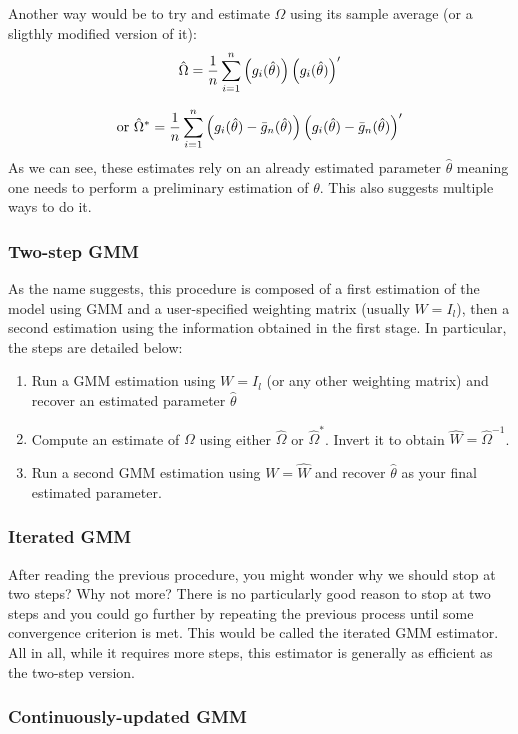 Another way would be to try and estimate $\Omega$ using its sample average (or a sligthly modified version of it): $$\hat\Omega = \frac{1}{n} \sum_{i=1}^{n}\left(g_i(\hat\theta)\right)\left(g_i(\hat\theta)\right)' $$

$$\text{or } \hat\Omega^* = \frac{1}{n} \sum_{i=1}^{n}\left(g_i(\hat\theta) - \bar g_n(\hat\theta)\right)\left(g_i(\hat\theta) - \bar g_n(\hat\theta)\right)' $$ As we can see, these estimates rely on an already estimated parameter $\hat\theta$ meaning one needs to perform a preliminary estimation of $\theta$. This also suggests multiple ways to do it.

\subsubsection{Two-step GMM}

As the name suggests, this procedure is composed of a first estimation of the model using GMM and a user-specified weighting matrix (usually $W = I_l$), then a second estimation using the information obtained in the first stage. In particular, the steps are detailed below: \begin{enumerate}
\item Run a GMM estimation using $W = I_l$ (or any other weighting matrix) and recover an estimated parameter $\hat\theta$
\item Compute an estimate of $\Omega$ using either $\hat\Omega$ or $\hat\Omega^*$. Invert it to obtain $\hat W = \hat\Omega^{-1}$.
\item Run a second GMM estimation using $W = \hat W$ and recover $\hat\theta$ as your final estimated parameter.
\end{enumerate} 

\subsubsection{Iterated GMM}

After reading the previous procedure, you might wonder why we should stop at two steps? Why not more? There is no particularly good reason to stop at two steps and you could go further by repeating the previous process until some convergence criterion is met. This would be called the iterated GMM estimator. All in all, while it requires more steps, this estimator is generally as efficient as the two-step version.

\subsubsection{Continuously-updated GMM}


